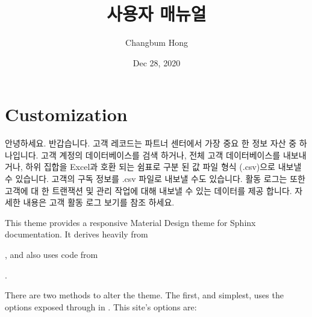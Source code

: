 \documentclass[letterpaper,10pt,english]{sphinxmanual}
\title{사용자 매뉴얼}
\date{Dec 28, 2020}
\author{Changbum Hong}
\begin{document}
\pagestyle{empty}
\sphinxmaketitle
\pagestyle{plain}
\sphinxtableofcontents
\pagestyle{normal}
\label{\detokenize{index::doc}}



\chapter{Customization}
\label{\detokenize{customization:customization}}\label{\detokenize{customization:id1}}\label{\detokenize{customization::doc}}
\noindent{}

안녕하세요. 반갑습니다. 고객 레코드는 파트너 센터에서 가장 중요 한 정보 자산 중 하나입니다. 고객 계정의 데이터베이스를 검색 하거나, 전체 고객 데이터베이스를 내보내거나, 하위 집합을 Excel과 호환 되는 쉼표로 구분 된 값 파일 형식 (.csv)으로 내보낼 수 있습니다. 고객의 구독 정보를 .csv 파일로 내보낼 수도 있습니다.
활동 로그는 또한 고객에 대 한 트랜잭션 및 관리 작업에 대해 내보낼 수 있는 데이터를 제공 합니다. 자세한 내용은 고객 활동 로그 보기를 참조 하세요.

This theme provides a responsive Material Design theme for Sphinx
documentation. It derives heavily from
%
\begin{footnote}[1]\sphinxAtStartFootnote
{}
%
\end{footnote},
and also uses code from
%
\begin{footnote}[2]\sphinxAtStartFootnote
{}
%
\end{footnote}.

There are two methods to alter the theme.  The first, and simplest, uses the
options exposed through  in . This site’s
options are:
\end{document}
